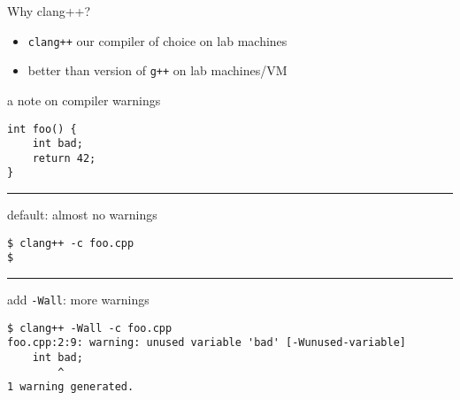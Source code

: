 \begin{frame}{Why clang++?}
\begin{itemize}
\item {\tt clang++} our compiler of choice on lab machines
\item better than version of {\tt g++} on lab machines/VM
\end{itemize}
\end{frame}


\begin{frame}[fragile,label=compWarnNote]{a note on compiler warnings}
\lstset{language=C++,style=small}
\begin{lstlisting}
int foo() {
    int bad;
    return 42;
}
\end{lstlisting}
\hrule
default: almost no warnings
\begin{Verbatim}[fontsize=\small\color{green!20!black}]
$ clang++ -c foo.cpp
$
\end{Verbatim}
\hrule
add {\tt-Wall}: more warnings
\begin{Verbatim}[fontsize=\small\color{green!20!black}]
$ clang++ -Wall -c foo.cpp
foo.cpp:2:9: warning: unused variable 'bad' [-Wunused-variable]
    int bad;
        ^
1 warning generated.
\end{Verbatim}
\end{frame}

